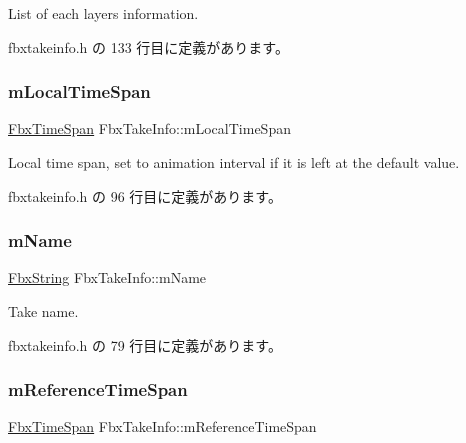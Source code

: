List of each layer\textquotesingle{}s information. 



 fbxtakeinfo.\+h の 133 行目に定義があります。

\mbox{\label{class_fbx_take_info_a5cbdcdad5fb1b692703784f6d8b6bc51}} 
\subsubsection{\texorpdfstring{m\+Local\+Time\+Span}{mLocalTimeSpan}}
{\footnotesize\ttfamily \hyperlink{class_fbx_time_span}{Fbx\+Time\+Span} Fbx\+Take\+Info\+::m\+Local\+Time\+Span}



Local time span, set to animation interval if it is left at the default value. 



 fbxtakeinfo.\+h の 96 行目に定義があります。

\mbox{\label{class_fbx_take_info_ac505b495f047d57eda55340f699f583e}} 
\subsubsection{\texorpdfstring{m\+Name}{mName}}
{\footnotesize\ttfamily \hyperlink{class_fbx_string}{Fbx\+String} Fbx\+Take\+Info\+::m\+Name}



Take name. 



 fbxtakeinfo.\+h の 79 行目に定義があります。

\mbox{\label{class_fbx_take_info_a26d1e723fc0e32e88b38a1aafbdf8665}} 
\subsubsection{\texorpdfstring{m\+Reference\+Time\+Span}{mReferenceTimeSpan}}
{\footnotesize\ttfamily \hyperlink{class_fbx_time_span}{Fbx\+Time\+Span} Fbx\+Take\+Info\+::m\+Reference\+Time\+Span}



